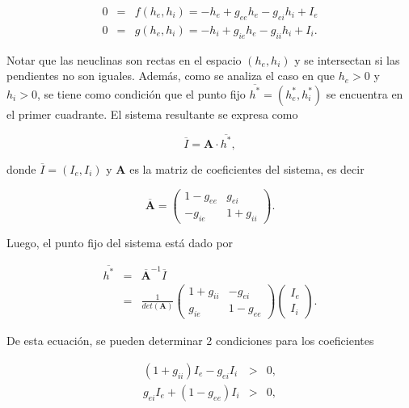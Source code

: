 \documentclass[11pt, twocolumn]{article}
\begin{document}
\begin{eqnarray*}
    0  &=& f(h_e, h_i) = -h_e + g_{ee} h_e - g_{ei} h_i + I_e\\
    0  &=& g(h_e, h_i) = -h_i + g_{ie} h_e - g_{ii} h_i + I_i.
\end{eqnarray*}

Notar que las neuclinas son rectas en el espacio \((h_e, h_i)\) y se intersectan si las pendientes no son iguales. Además, como se analiza el caso en que \(h_e >0\) y \(h_i>0\), se tiene como condición que el punto fijo \(\overline{h^*} = (h_e^*, h_i^*)\) se encuentra en el primer cuadrante. El sistema resultante se expresa como 

\begin{equation*}
    \overline{I} = \mathbf{A} \cdot \overline{h^*},
\end{equation*}


\noindent donde \(\overline{I} = (I_e, I_i)\) y \(\mathbf{A}\) es la matriz de coeficientes del sistema, es decir 

\begin{equation*}
    \overline{\mathbf{A}} = \begin{pmatrix}
        1 - g_{ee} & g_{ei} \\
        -g_{ie} & 1 + g_{ii}
    \end{pmatrix}.
\end{equation*}

Luego, el punto fijo del sistema está dado por 

\begin{eqnarray*}
    \overline{h^*} &=& \overline{\mathbf{A}}^{-1} \overline{I} \\
    &=& \frac{1}{det(\mathbf{A})} \begin{pmatrix} 
        1 + g_{ii} & -g_{ei} \\
        g_{ie} & 1 - g_{ee}
    \end{pmatrix} \begin{pmatrix}
        I_e \\ I_i
    \end{pmatrix}.
\end{eqnarray*}

De esta ecuación, se pueden determinar 2 condiciones para los coeficientes

\begin{eqnarray}
    (1 + g_{ii}) I_e - g_{ei} I_i &>& 0, \label{eq:cond_1} \\ 
    g_{ei} I_e + (1-g_{ee})I_i&>& 0, \label{eq:cond_2}
\end{eqnarray}
\end{document}
